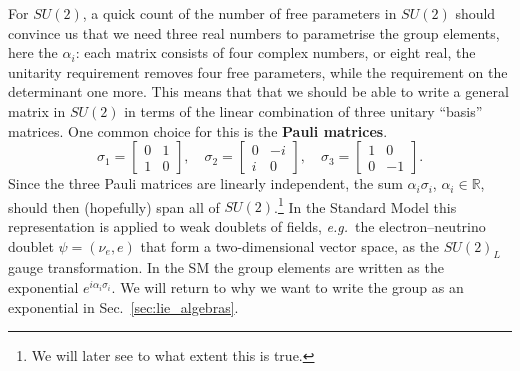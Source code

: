 \documentclass[notes.tex]{subfiles}
\begin{document}
For $SU(2)$, a quick count of the number of free parameters in $SU(2)$ should convince us that we need three real numbers to parametrise the group elements, here the $\alpha_i$: each matrix consists of four complex numbers, or eight real, the unitarity requirement removes four free parameters, while the requirement on the determinant one more. This means that that we should be able to write a general matrix in $SU(2)$ in terms of the linear combination of three unitary ``basis'' matrices. One common choice for this is the {\bf Pauli matrices}. 
\begin{equation}
\sigma_1 =\left[\begin{matrix} 0 & 1 \\ 1 & 0 \end{matrix}\right], 
\quad \sigma_2 =\left[\begin{matrix} 0 & -i \\ i & 0 \end{matrix}\right], 
\quad \sigma_3 =\left[\begin{matrix} 1 & 0 \\ 0 & -1 \end{matrix}\right].
\label{eq:pauli_matrices}
\end{equation}
Since the three Pauli matrices are linearly independent, the sum $\alpha_i\sigma_i$, $\alpha_i\in\mathbb R$, should then (hopefully) span all of $SU(2)$.\footnote{We will later see to what extent this is true.} In the Standard Model this representation is applied to weak doublets of fields, {\it e.g.}\ the electron--neutrino doublet $\psi = (\nu_e, e)$ that form a two-dimensional vector space, as the $SU(2)_L$ gauge transformation. In the SM the group elements are written as the exponential  $e^{i \alpha_i \sigma_i}$. We will return to why we want to write the group as an exponential in Sec.~\ref{sec:lie_algebras}. 
\end{document}
